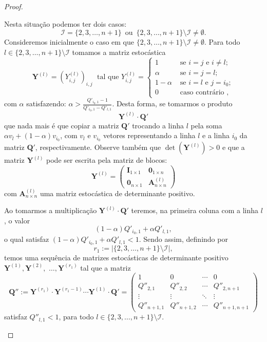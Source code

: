 \documentclass[twoside,openright,titlepage,numbers=noenddot,headinclude,  lineheaders footinclude=true,cleardoublepage=empty,
                                BCOR=5mm,paper=a4,fontsize=12pt ]{scrbook}
\theoremstyle{definition}
\begin{document}
\begin{proof}
\begin{enumerate}[(i)]
Nesta situação podemos ter dois casos:
\[
\mathcal{I} = \{2, 3, \ldots, n+1\} \, \text{ ou } \,
 \{2, 3, \ldots, n+1\} \setminus \mathcal{I} \neq \emptyset.
\]
Consideremos inicialmente o caso em que
$ \{2, 3, \ldots, n+1\} \setminus \mathcal{I} \neq \emptyset$. 
Para todo 
$l \in \{2, 3, \ldots, n+1\} \setminus \mathcal{I}$
tomamos a matriz estocástica
\[
\mathbf{Y}^{(l)} = \left(Y^{(l)}_{i,j}\right)_{i,j} \;
\text{ tal que }
Y^{(l)}_{i,j} = 
\begin{cases}
1 & \text{ se } i = j \text{ e } i \neq l;\\
\alpha &\text{ se } i = j = l;\\
1 - \alpha & \text{ se } i = l \text{ e } j = i_0;\\
0 & \text{ caso contrário },
\end{cases}
\]
com $\alpha$ satisfazendo: $ \alpha > \frac{Q'_{i_0,1} - 1}
{ Q'_{i_0,1} - Q'_{l,1}}$. Desta forma, se tomarmos o 
produto
\[
\mathbf{Y}^{(l)} \cdot \mathbf{Q'}
\]
que nada mais é que copiar a matriz $\mathbf{Q'}$ trocando a 
linha $l$ pela soma \mbox{$\alpha v_l + ( 1 - \alpha) v_{i_0}$},
com $v_l$ e $v_{i_0}$ vetores representando a linha $l$ e
a linha $i_0$ da matriz $\mathbf{Q'}$, respectivamente.
Observe também que $\det(\mathbf{Y}^{(l)}) > 0 $ e
que a matriz $\mathbf{Y}^{(l)}$ pode ser escrita pela
matriz de blocos:
\[
\mathbf{Y}^{(l)} = 
\begin{pmatrix}
 \mathbf{I}_{1 \times 1} &  \mathbf{0}_{1 \times n}\\
\mathbf{0}_{n \times 1} & \mathbf{A}^{(l)}_{n \times n} 
\end{pmatrix}
\]
com $\mathbf{A}^{(l)}_{n \times n}$ uma matriz estocástica 
de determinante positivo.

Ao tomarmos a multiplicação 
$\mathbf{Y}^{(l)} \cdot \mathbf{Q'}$ teremos, na primeira
coluna com a linha $l$, o valor
\[
(1 - \alpha) Q'_{i_0,1} + \alpha Q'_{l,1},
\]
o qual satisfaz 
$(1 - \alpha) Q'_{i_0,1} + \alpha Q'_{l,1} < 1$.
Sendo assim, definindo por 
\[r_1 := | \{2, 3, \ldots, n+1\} \setminus \mathcal{I}|,\]
 temos
uma sequência de matrizes estocásticas  de determinante
positivo $\mathbf{Y}^{(1)}, \mathbf{Y}^{(2)},$
$\ldots, \mathbf{Y}^{(r_1)}$ tal que a matriz
\[
 \mathbf{Q''} :=
\mathbf{Y}^{(r_1)} \cdot \mathbf{Y}^{(r_1 - 1)}  \cdots
 \mathbf{Y}^{(1)} \cdot \mathbf{Q'} = 
\begin{pmatrix}
1 & 0 & \cdots & 0\\
Q''_{2,1} & Q''_{2,2} & \cdots & Q''_{2,n+1}\\
\vdots & \vdots & \ddots & \vdots\\
Q''_{n+1,1} & Q''_{n+1,2} & \cdots & Q''_{n+1,n+1}
\end{pmatrix}
\]
satisfaz $Q''_{l, 1} < 1$, para todo $l \in 
 \{2, 3, \ldots, n+1\} \setminus \mathcal{I}$.


\end{enumerate}
\end{proof}
\end{document}
